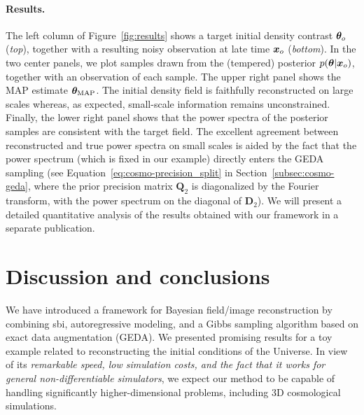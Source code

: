 \paragraph{Results.}The left column of Figure~\ref{fig:results} shows a target initial density contrast ${\bm{\theta}}_o$ ({\it top}), together with a resulting noisy observation at late time ${\bm{x}}_o$ ({\it bottom}). In the two center panels, we plot samples drawn from the (tempered) posterior $p(\bm{\theta} | {\bm{x}}_o)$, together with an observation of each sample. The upper right panel shows the MAP estimate ${\bm{\theta}}_{\text{MAP}}$. The initial density field is faithfully reconstructed on large scales whereas, as expected, small-scale information remains unconstrained. Finally, the lower right panel shows that the power spectra of the posterior samples are consistent with the target field. The excellent agreement between reconstructed and true power spectra on small scales is aided by the fact that the power spectrum (which is fixed in our example) directly enters the GEDA sampling (see Equation~\ref{eq:cosmo-precision_split} in Section~\ref{subsec:cosmo-geda}, where the prior precision matrix ${\bm Q}_2$ is diagonalized by the Fourier transform, with the power spectrum on the diagonal of ${\bm D}_2$). We will present a detailed quantitative analysis of the results obtained with our framework in a separate publication.

\section{Discussion and conclusions} \label{sec:cosmo-conc}
We have introduced a framework for Bayesian field/image reconstruction by combining \gls*{sbi}, autoregressive modeling, and a Gibbs sampling algorithm based on exact data augmentation (GEDA). We presented promising results for a toy example related to reconstructing the initial conditions of the Universe. In view of its \textit{remarkable speed, low simulation costs, and the fact that it works for general non-differentiable simulators}, we expect our method to be capable of handling significantly higher-dimensional problems, including 3D cosmological simulations.

